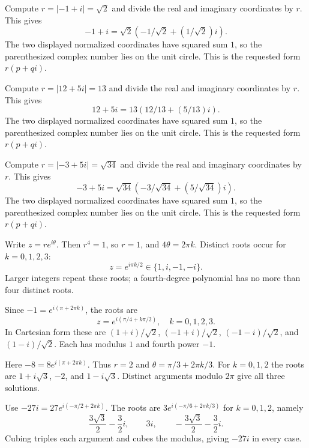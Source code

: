 
Compute $r=|-1+i|=\sqrt2$ and divide the real and imaginary coordinates by $r$. This gives
\[-1+i=\sqrt2\left(-1/\sqrt2+\left(1/\sqrt2\right)i\right).
\]
The two displayed normalized coordinates have squared sum $1$, so the parenthesized complex number lies on the unit circle. This is the requested form $r(p+qi)$.


Compute $r=|12+5i|=13$ and divide the real and imaginary coordinates by $r$. This gives
\[12+5i=13\left(12/13+\left(5/13\right)i\right).
\]
The two displayed normalized coordinates have squared sum $1$, so the parenthesized complex number lies on the unit circle. This is the requested form $r(p+qi)$.


Compute $r=|-3+5i|=\sqrt{34}$ and divide the real and imaginary coordinates by $r$. This gives
\[-3+5i=\sqrt{34}\left(-3/\sqrt{34}+\left(5/\sqrt{34}\right)i\right).
\]
The two displayed normalized coordinates have squared sum $1$, so the parenthesized complex number lies on the unit circle. This is the requested form $r(p+qi)$.


Write $z=re^{i\theta}$. Then $r^4=1$, so $r=1$, and $4\theta=2\pi k$. Distinct roots occur for $k=0,1,2,3$:
\[z=e^{i\pi k/2}\in\{1,i,-1,-i\}.\]
Larger integers repeat these roots; a fourth-degree polynomial has no more than four distinct roots.


Since $-1=e^{i(\pi+2\pi k)}$, the roots are
\[z=e^{i(\pi/4+k\pi/2)},\quad k=0,1,2,3.
\]
In Cartesian form these are $(1+i)/\sqrt2$, $(-1+i)/\sqrt2$, $(-1-i)/\sqrt2$, and $(1-i)/\sqrt2$. Each has modulus $1$ and fourth power $-1$.


Here $-8=8e^{i(\pi+2\pi k)}$. Thus $r=2$ and $\theta=\pi/3+2\pi k/3$. For $k=0,1,2$ the roots are $1+i\sqrt3$, $-2$, and $1-i\sqrt3$. Distinct arguments modulo $2\pi$ give all three solutions.


Use $-27i=27e^{i(-\pi/2+2\pi k)}$. The roots are $3e^{i(-\pi/6+2\pi k/3)}$ for $k=0,1,2$, namely
\[\frac{3\sqrt3}{2}-\frac32i,\qquad3i,\qquad-\frac{3\sqrt3}{2}-\frac32i.
\]
Cubing triples each argument and cubes the modulus, giving $-27i$ in every case.

